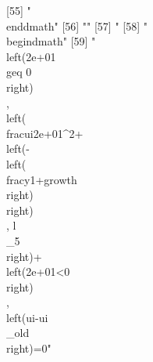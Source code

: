  [55] "\\end{dmath}"                                                                                                                                                                                                                                                                                                                                                                                                                                                                                
 [56] ""                                                                                                                                                                                                                                                                                                                                                                                                                                                                                            
 [57] "%
 [58] "\\begin{dmath}"                                                                                                                                                                                                                                                                                                                                                                                                                                                                              
 [59] "\\left(2e+01\\geq 0\\right)\\, \\left(\\frac{{ui}}{2e+01^{2}}+\\left(-\\left(\\frac{{y}}{1+{growth}}\\right)\\right)\\, {{l\\_5}}\\right)+\\left(2e+01<0\\right)\\, \\left({ui}-{{ui\\_old}}\\right)=0"                                                                                                                                                                                                                                                                                      
